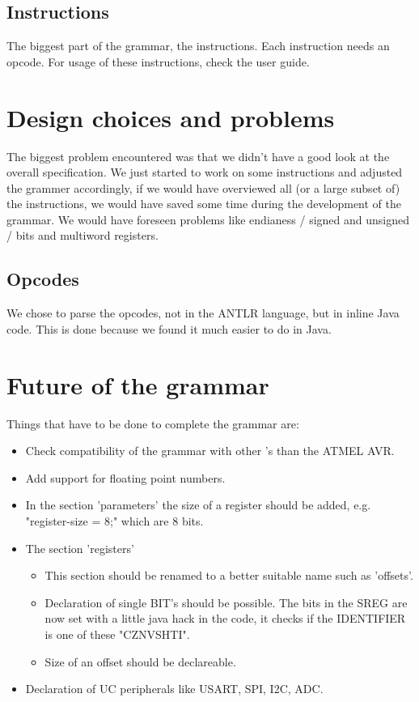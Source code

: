 \subsection{Instructions}
The biggest part of the grammar, the instructions. Each instruction needs an opcode. For usage of these instructions, check the user guide.

\section{Design choices and problems}
The biggest problem encountered was that we didn't have a good look at the overall \UC specification. We just started to work on some instructions and adjusted the grammer accordingly, if we would have overviewed all (or a large subset of) the instructions, we would have saved some time during the development of the grammar. We would have foreseen problems like endianess / signed and unsigned / bits and multiword registers.

\subsection{Opcodes}
We chose to parse the opcodes, not in the ANTLR language, but in inline Java code. This is done because we found it much easier to do in Java.

\section{Future of the grammar}
Things that have to be done to complete the grammar are:
\begin{itemize}
\item Check compatibility of the grammar with other {\UC}'s than the ATMEL AVR.
\item Add support for floating point numbers.
\item In the section 'parameters' the size of a register should be added, e.g. "register-size = 8;" which are 8 bits.
\item The section 'registers'
\begin{itemize}
\item This section should be renamed to a better suitable name such as 'offsets'.
\item Declaration of single BIT's should be possible. The bits in the \ac{SREG} are now set with a little java hack in the code, it checks if the IDENTIFIER is one of these "CZNVSHTI".  
\item Size of an offset should be declareable.
\end{itemize}
\item Declaration of \ac{UC} peripherals like USART, SPI, I2C, ADC.
\end{itemize}
